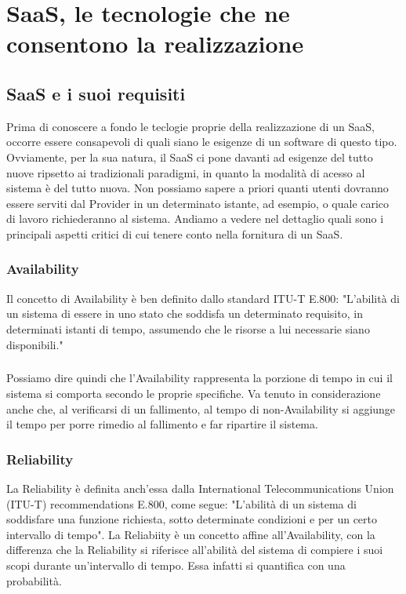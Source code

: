\chapter{SaaS, le tecnologie che ne consentono la realizzazione}

\section{SaaS e i suoi requisiti}
Prima di conoscere a fondo le teclogie proprie della realizzazione di un SaaS, occorre essere consapevoli di quali siano le esigenze di un software di questo tipo. Ovviamente, per la sua natura, il SaaS ci pone davanti ad esigenze del tutto nuove ripsetto ai tradizionali paradigmi, in quanto la modalità di acesso al sistema è del tutto nuova. Non possiamo sapere a priori quanti utenti dovranno essere serviti dal Provider in un determinato istante, ad esempio, o quale carico di lavoro richiederanno al sistema. Andiamo a vedere nel dettaglio quali sono i principali aspetti critici di cui tenere conto nella fornitura di un SaaS.

\subsection{Availability}
Il concetto di Availability è ben definito dallo standard ITU-T E.800: "L'abilità di un sistema di essere in uno stato che soddisfa un determinato requisito, in determinati istanti di tempo, assumendo che le risorse a lui necessarie siano disponibili." 

\paragraph{}
Possiamo dire quindi che l'Availability rappresenta la porzione di tempo in cui il sistema si comporta secondo le proprie specifiche. Va tenuto in considerazione anche che, al verificarsi di un fallimento, al tempo di non-Availability si aggiunge il tempo per porre rimedio al fallimento e far ripartire il sistema. 

\subsection{Reliability}
La Reliability è definita anch'essa dalla International Telecommunications Union (ITU-T) recommendations E.800, come segue: "L'abilità di un sistema di soddisfare una funzione richiesta, sotto determinate condizioni e per un certo intervallo di tempo". La Reliabiity è un concetto affine all'Availability, con la differenza che la Reliability si riferisce all'abilità del sistema di compiere i suoi scopi durante un'intervallo di tempo. Essa infatti si quantifica con una probabilità.

